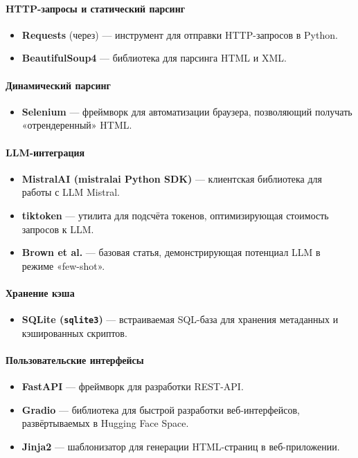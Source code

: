 \paragraph{HTTP-запросы и статический парсинг}
\begin{itemize}
    \item \textbf{Requests} (через\cite{python-official}) — инструмент для отправки HTTP-запросов в Python.
    \item \textbf{BeautifulSoup4}\cite{bs4-doc} — библиотека для парсинга HTML и XML.
\end{itemize}

\paragraph{Динамический парсинг}
\begin{itemize}
    \item \textbf{Selenium}\cite{selenium-doc} — фреймворк для автоматизации браузера, позволяющий получать «отрендеренный» HTML.
\end{itemize}

\paragraph{LLM-интеграция}
\begin{itemize}
    \item \textbf{MistralAI (mistralai Python SDK)}\cite{mistral-github} — клиентская библиотека для работы с LLM Mistral.
    \item \textbf{tiktoken}\cite{tiktoken-github} — утилита для подсчёта токенов, оптимизирующая стоимость запросов к LLM.
    \item \textbf{Brown et al.\cite{brown2020language}} — базовая статья, демонстрирующая потенциал LLM в режиме «few-shot».
\end{itemize}

\paragraph{Хранение кэша}
\begin{itemize}
    \item \textbf{SQLite (\texttt{sqlite3})}\cite{sqlite-official} — встраиваемая SQL-база для хранения метаданных и кэшированных скриптов.
\end{itemize}

\paragraph{Пользовательские интерфейсы}
\begin{itemize}
    \item \textbf{FastAPI}\cite{fastapi-official} — фреймворк для разработки REST-API.
    \item \textbf{Gradio}\cite{gradio-official} — библиотека для быстрой разработки веб-интерфейсов, развёртываемых в Hugging Face Space.
    \item \textbf{Jinja2}\cite{jinja2-official} — шаблонизатор для генерации HTML-страниц в веб-приложении.
\end{itemize}

